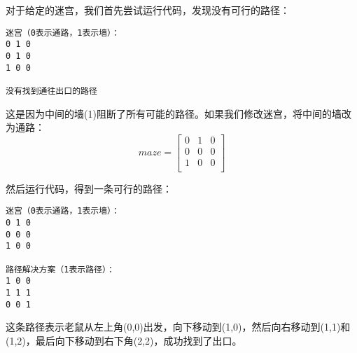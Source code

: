 \documentclass[12pt,twoside]{article}
\begin{document}
\begin{problems}
对于给定的迷宫，我们首先尝试运行代码，发现没有可行的路径：
\begin{verbatim}
迷宫（0表示通路，1表示墙）：
0 1 0
0 1 0
1 0 0

没有找到通往出口的路径
\end{verbatim}

这是因为中间的墙(1)阻断了所有可能的路径。如果我们修改迷宫，将中间的墙改为通路：
\[
maze=
\begin{bmatrix}
   0&1 &0\\ 
   0 &0& 0 \\
   1 &0 &0 \\
\end{bmatrix} 
\]

然后运行代码，得到一条可行的路径：
\begin{verbatim}
迷宫（0表示通路，1表示墙）：
0 1 0
0 0 0
1 0 0

路径解决方案（1表示路径）：
1 0 0
1 1 1
0 0 1
\end{verbatim}

这条路径表示老鼠从左上角(0,0)出发，向下移动到(1,0)，然后向右移动到(1,1)和(1,2)，最后向下移动到右下角(2,2)，成功找到了出口。

\eparts



\end{problems}
\end{document}
